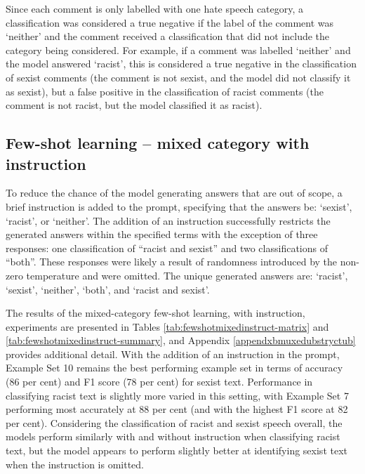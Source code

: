 \documentclass{bmcart}
\begin{document}
Since each comment is only labelled with one hate speech category, a classification was considered a true negative if the label of the comment was `neither' and the comment received a classification that did not include the category being considered. For example, if a comment was labelled `neither' and the model answered `racist', this is considered a true negative in the classification of sexist comments (the comment is not sexist, and the model did not classify it as sexist), but a false positive in the classification of racist comments (the comment is not racist, but the model classified it as racist).



\subsection{Few-shot learning -- mixed category with instruction}\label{few-shot-learning-mixed-category-with-instruction}

To reduce the chance of the model generating answers that are out of scope, a brief instruction is added to the prompt, specifying that the answers be: `sexist', `racist', or `neither'. The addition of an instruction successfully restricts the generated answers within the specified terms with the exception of three responses: one classification of ``racist and sexist'' and two classifications of ``both''. These responses were likely a result of randomness introduced by the non-zero temperature and were omitted. The unique generated answers are: `racist', `sexist', `neither', `both', and `racist and sexist'.

The results of the mixed-category few-shot learning, with instruction, experiments are presented in Tables \ref{tab:fewshotmixedinstruct-matrix} and \ref{tab:fewshotmixedinstruct-summary}, and Appendix \ref{appendxbmuxedubstryctub} provides additional detail. With the addition of an instruction in the prompt, Example Set 10 remains the best performing example set in terms of accuracy (86 per cent) and F1 score (78 per cent) for sexist text. Performance in classifying racist text is slightly more varied in this setting, with Example Set 7 performing most accurately at 88 per cent (and with the highest F1 score at 82 per cent). Considering the classification of racist and sexist speech overall, the models perform similarly with and without instruction when classifying racist text, but the model appears to perform slightly better at identifying sexist text when the instruction is omitted.
\end{document}
